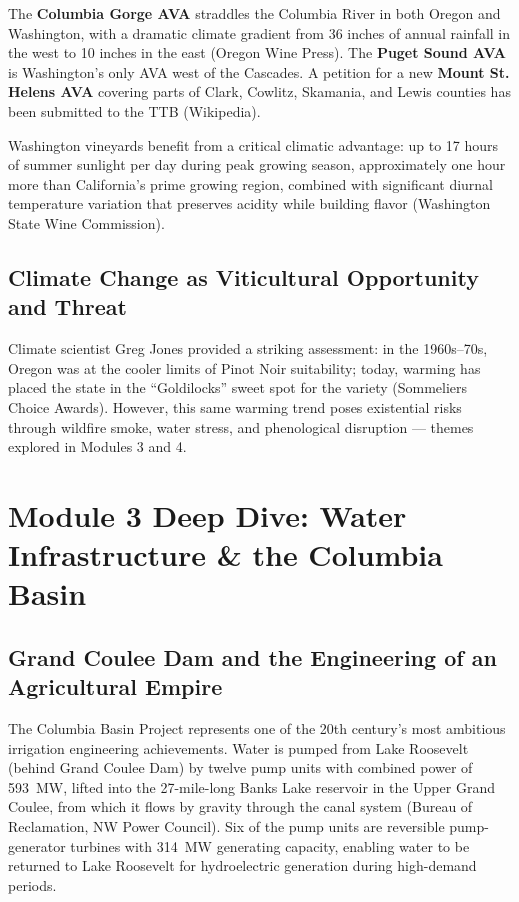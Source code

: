 \documentclass[11pt,letterpaper]{article}
\begin{document}
The \textbf{Columbia Gorge AVA} straddles the Columbia River in both Oregon and Washington, with a dramatic climate gradient from 36 inches of annual rainfall in the west to 10 inches in the east (Oregon Wine Press). The \textbf{Puget Sound AVA} is Washington's only AVA west of the Cascades. A petition for a new \textbf{Mount St. Helens AVA} covering parts of Clark, Cowlitz, Skamania, and Lewis counties has been submitted to the TTB (Wikipedia).

Washington vineyards benefit from a critical climatic advantage: up to 17 hours of summer sunlight per day during peak growing season, approximately one hour more than California's prime growing region, combined with significant diurnal temperature variation that preserves acidity while building flavor (Washington State Wine Commission).

\subsection{Climate Change as Viticultural Opportunity and Threat}

Climate scientist Greg Jones provided a striking assessment: in the 1960s--70s, Oregon was at the cooler limits of Pinot Noir suitability; today, warming has placed the state in the ``Goldilocks'' sweet spot for the variety (Sommeliers Choice Awards). However, this same warming trend poses existential risks through wildfire smoke, water stress, and phenological disruption --- themes explored in Modules 3 and 4.

\newpage
\section{Module 3 Deep Dive: Water Infrastructure \& the Columbia Basin}

\subsection{Grand Coulee Dam and the Engineering of an Agricultural Empire}

The Columbia Basin Project represents one of the 20th century's most ambitious irrigation engineering achievements. Water is pumped from Lake Roosevelt (behind Grand Coulee Dam) by twelve pump units with combined power of 593~MW, lifted into the 27-mile-long Banks Lake reservoir in the Upper Grand Coulee, from which it flows by gravity through the canal system (Bureau of Reclamation, NW Power Council). Six of the pump units are reversible pump-generator turbines with 314~MW generating capacity, enabling water to be returned to Lake Roosevelt for hydroelectric generation during high-demand periods.
\end{document}
